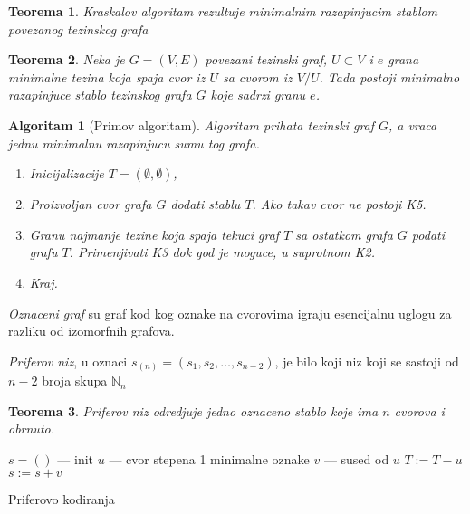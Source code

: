 \documentclass[12p, a4paper]{article}
\newtheorem*{theorem}{Teorema}
\newtheorem*{alg}{Algoritam}
\begin{document}
\begin{multicols}{2}
    \begin{theorem}
        Kraskalov algoritam rezultuje minimalnim razapinjucim stablom povezanog
        tezinskog grafa
    \end{theorem}

    \begin{theorem}
        Neka je $G = (V, E)$ povezani tezinski graf, $U \subset V$ i $e$ grana
        minimalne tezina koja spaja cvor iz $U$ sa cvorom iz $V/U$. Tada
        postoji minimalno razapinjuce stablo tezinskog grafa $G$ koje
        sadrzi granu $e$.
    \end{theorem}

    \begin{alg}[Primov algoritam]
        Algoritam prihata tezinski graf $G$, a vraca jednu minimalnu 
        razapinjucu sumu tog grafa.
        \begin{enumerate}
            \itemsep0em
            \item [K1] Inicijalizacije $T = (\emptyset, \emptyset)$, 
            \item [K2] Proizvoljan cvor grafa $G$ dodati stablu $T$.
                  Ako takav cvor ne postoji K5.
            \item [K3] Granu najmanje tezine koja spaja tekuci graf $T$ sa
                  ostatkom grafa $G$ podati grafu $T$.
                  Primenjivati K3 dok god je moguce, u suprotnom K2.
            \item [K5] Kraj.
        \end{enumerate}
    \end{alg}

    \emph{Oznaceni graf} su graf kod kog oznake na cvorovima igraju esencijalnu
    uglogu za razliku od izomorfnih grafova.

    \emph{Priferov niz}, u oznaci $s_{(n)} = (s_1, s_2, \ldots, s_{n-2})$, je
    bilo koji niz koji se sastoji od $n-2$ broja skupa $\mathbb{N}_n$

    \begin{theorem}
        Priferov niz odredjuje jedno oznaceno stablo koje ima $n$ cvorova
        i obrnuto.
    \end{theorem}


    \begin{algorithm}[H]
        $s = ()$ --- init\;
        {$u$ --- cvor stepena 1 minimalne oznake\;
        $v$ --- sused od $u$\;
        $T:= T - u$\;
        $s:= s + v$\;}
        \caption{Priferovo kodiranja}
    \end{algorithm}


\end{multicols}
\end{document}
